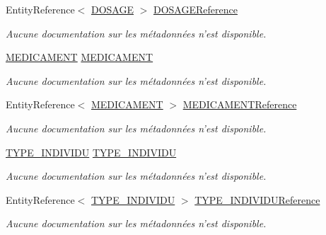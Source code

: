 \begin{DoxyCompactItemize}
Entity\-Reference$<$ \hyperlink{class_model_1_1_d_o_s_a_g_e}{D\-O\-S\-A\-G\-E} $>$ \hyperlink{class_model_1_1_p_r_e_s_c_r_i_r_e_a5b8a8b554f87bbf94855802f7bfb1815}{D\-O\-S\-A\-G\-E\-Reference}
\begin{DoxyCompactList}\small\item\em Aucune documentation sur les métadonnées n'est disponible. \end{DoxyCompactList}\item 
\hyperlink{class_model_1_1_m_e_d_i_c_a_m_e_n_t}{M\-E\-D\-I\-C\-A\-M\-E\-N\-T} \hyperlink{class_model_1_1_p_r_e_s_c_r_i_r_e_ac2d56f6ccfeff98e9e4e75ebeb8a183b}{M\-E\-D\-I\-C\-A\-M\-E\-N\-T}
\begin{DoxyCompactList}\small\item\em Aucune documentation sur les métadonnées n'est disponible. \end{DoxyCompactList}\item 
Entity\-Reference$<$ \hyperlink{class_model_1_1_m_e_d_i_c_a_m_e_n_t}{M\-E\-D\-I\-C\-A\-M\-E\-N\-T} $>$ \hyperlink{class_model_1_1_p_r_e_s_c_r_i_r_e_ae6eb0aa552e585dcd17936b993947f0c}{M\-E\-D\-I\-C\-A\-M\-E\-N\-T\-Reference}
\begin{DoxyCompactList}\small\item\em Aucune documentation sur les métadonnées n'est disponible. \end{DoxyCompactList}\item 
\hyperlink{class_model_1_1_t_y_p_e___i_n_d_i_v_i_d_u}{T\-Y\-P\-E\-\_\-\-I\-N\-D\-I\-V\-I\-D\-U} \hyperlink{class_model_1_1_p_r_e_s_c_r_i_r_e_a894c92b24554d0819f2ac129895a7980}{T\-Y\-P\-E\-\_\-\-I\-N\-D\-I\-V\-I\-D\-U}
\begin{DoxyCompactList}\small\item\em Aucune documentation sur les métadonnées n'est disponible. \end{DoxyCompactList}\item 
Entity\-Reference$<$ \hyperlink{class_model_1_1_t_y_p_e___i_n_d_i_v_i_d_u}{T\-Y\-P\-E\-\_\-\-I\-N\-D\-I\-V\-I\-D\-U} $>$ \hyperlink{class_model_1_1_p_r_e_s_c_r_i_r_e_aa58692d5b4e38e34b13f7df01fdcb321}{T\-Y\-P\-E\-\_\-\-I\-N\-D\-I\-V\-I\-D\-U\-Reference}
\begin{DoxyCompactList}\small\item\em Aucune documentation sur les métadonnées n'est disponible. \end{DoxyCompactList}\end{DoxyCompactItemize}


